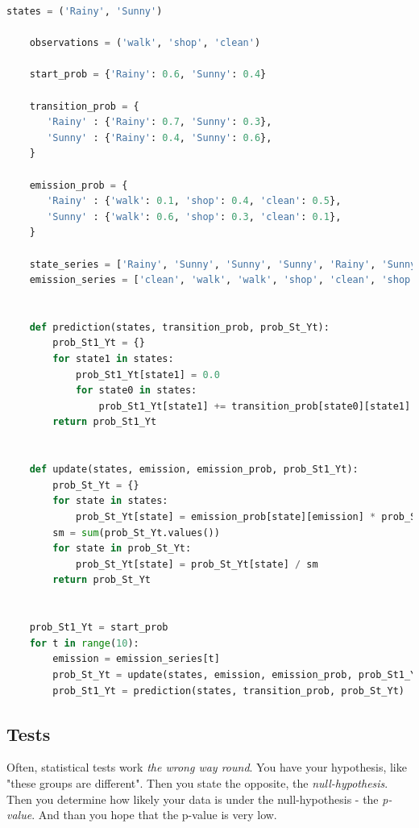 \begin{lstlisting}[language=python]
    states = ('Rainy', 'Sunny')
     
    observations = ('walk', 'shop', 'clean')
     
    start_prob = {'Rainy': 0.6, 'Sunny': 0.4}
     
    transition_prob = {
       'Rainy' : {'Rainy': 0.7, 'Sunny': 0.3},
       'Sunny' : {'Rainy': 0.4, 'Sunny': 0.6},
    }
     
    emission_prob = {
       'Rainy' : {'walk': 0.1, 'shop': 0.4, 'clean': 0.5},
       'Sunny' : {'walk': 0.6, 'shop': 0.3, 'clean': 0.1},
    }
    
    state_series = ['Rainy', 'Sunny', 'Sunny', 'Sunny', 'Rainy', 'Sunny', 'Rainy', 'Rainy', 'Sunny', 'Sunny', 'Sunny']
    emission_series = ['clean', 'walk', 'walk', 'shop', 'clean', 'shop', 'clean', 'clean', 'clean', 'shop', 'clean']
    
    
    def prediction(states, transition_prob, prob_St_Yt):
        prob_St1_Yt = {}
        for state1 in states:
            prob_St1_Yt[state1] = 0.0
            for state0 in states:
                prob_St1_Yt[state1] += transition_prob[state0][state1] * prob_St_Yt[state0]
        return prob_St1_Yt
    
    
    def update(states, emission, emission_prob, prob_St1_Yt):
        prob_St_Yt = {}
        for state in states:
            prob_St_Yt[state] = emission_prob[state][emission] * prob_St1_Yt[state]
        sm = sum(prob_St_Yt.values())
        for state in prob_St_Yt:
            prob_St_Yt[state] = prob_St_Yt[state] / sm
        return prob_St_Yt
    
            
    prob_St1_Yt = start_prob
    for t in range(10):
        emission = emission_series[t]
        prob_St_Yt = update(states, emission, emission_prob, prob_St1_Yt)
        prob_St1_Yt = prediction(states, transition_prob, prob_St_Yt)
\end{lstlisting}



\subsection{Tests}
Often, statistical tests work \emph{the wrong way round}. You have your hypothesis, like "these groups are different". Then you state the opposite, the \emph{null-hypothesis}. Then you determine how likely your data is under the null-hypothesis - the \emph{p-value}. And than you hope that the p-value is very low.

